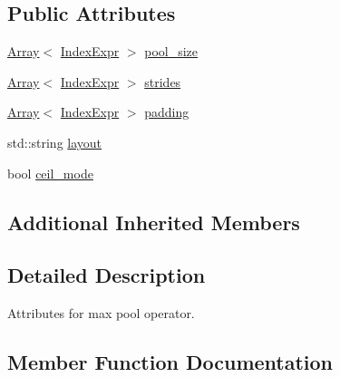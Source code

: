 \subsection*{Public Attributes}
\begin{DoxyCompactItemize}
\item 
\hyperlink{classtvm_1_1Array}{Array}$<$ \hyperlink{namespacetvm_1_1relay_ae153a27d81399fd266b8d598227764c4}{Index\+Expr} $>$ \hyperlink{structtvm_1_1relay_1_1MaxPool2DAttrs_a7cf50a702126aab8f4a3458eb09fc556}{pool\+\_\+size}
\item 
\hyperlink{classtvm_1_1Array}{Array}$<$ \hyperlink{namespacetvm_1_1relay_ae153a27d81399fd266b8d598227764c4}{Index\+Expr} $>$ \hyperlink{structtvm_1_1relay_1_1MaxPool2DAttrs_a56524c8a3dbc632021ac133f4270c301}{strides}
\item 
\hyperlink{classtvm_1_1Array}{Array}$<$ \hyperlink{namespacetvm_1_1relay_ae153a27d81399fd266b8d598227764c4}{Index\+Expr} $>$ \hyperlink{structtvm_1_1relay_1_1MaxPool2DAttrs_a801de4e07dd395a5e4492f9a289e7cdb}{padding}
\item 
std\+::string \hyperlink{structtvm_1_1relay_1_1MaxPool2DAttrs_a44abfeaaa6f5b6de5048b08c191e14e8}{layout}
\item 
bool \hyperlink{structtvm_1_1relay_1_1MaxPool2DAttrs_a40f8ca285721a1a69b37ab630d601632}{ceil\+\_\+mode}
\end{DoxyCompactItemize}
\subsection*{Additional Inherited Members}


\subsection{Detailed Description}
Attributes for max pool operator. 

\subsection{Member Function Documentation}
